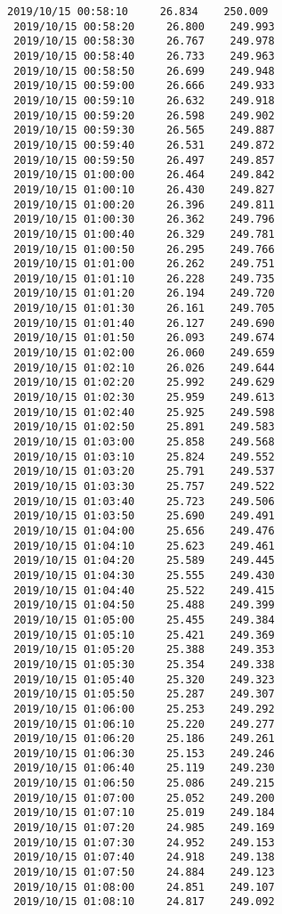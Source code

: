 \documentclass[11pt]{article}
\begin{document}
\begin{Verbatim}[commandchars=\\\{\}]
 2019/10/15 00:58:10     26.834    250.009
 2019/10/15 00:58:20     26.800    249.993
 2019/10/15 00:58:30     26.767    249.978
 2019/10/15 00:58:40     26.733    249.963
 2019/10/15 00:58:50     26.699    249.948
 2019/10/15 00:59:00     26.666    249.933
 2019/10/15 00:59:10     26.632    249.918
 2019/10/15 00:59:20     26.598    249.902
 2019/10/15 00:59:30     26.565    249.887
 2019/10/15 00:59:40     26.531    249.872
 2019/10/15 00:59:50     26.497    249.857
 2019/10/15 01:00:00     26.464    249.842
 2019/10/15 01:00:10     26.430    249.827
 2019/10/15 01:00:20     26.396    249.811
 2019/10/15 01:00:30     26.362    249.796
 2019/10/15 01:00:40     26.329    249.781
 2019/10/15 01:00:50     26.295    249.766
 2019/10/15 01:01:00     26.262    249.751
 2019/10/15 01:01:10     26.228    249.735
 2019/10/15 01:01:20     26.194    249.720
 2019/10/15 01:01:30     26.161    249.705
 2019/10/15 01:01:40     26.127    249.690
 2019/10/15 01:01:50     26.093    249.674
 2019/10/15 01:02:00     26.060    249.659
 2019/10/15 01:02:10     26.026    249.644
 2019/10/15 01:02:20     25.992    249.629
 2019/10/15 01:02:30     25.959    249.613
 2019/10/15 01:02:40     25.925    249.598
 2019/10/15 01:02:50     25.891    249.583
 2019/10/15 01:03:00     25.858    249.568
 2019/10/15 01:03:10     25.824    249.552
 2019/10/15 01:03:20     25.791    249.537
 2019/10/15 01:03:30     25.757    249.522
 2019/10/15 01:03:40     25.723    249.506
 2019/10/15 01:03:50     25.690    249.491
 2019/10/15 01:04:00     25.656    249.476
 2019/10/15 01:04:10     25.623    249.461
 2019/10/15 01:04:20     25.589    249.445
 2019/10/15 01:04:30     25.555    249.430
 2019/10/15 01:04:40     25.522    249.415
 2019/10/15 01:04:50     25.488    249.399
 2019/10/15 01:05:00     25.455    249.384
 2019/10/15 01:05:10     25.421    249.369
 2019/10/15 01:05:20     25.388    249.353
 2019/10/15 01:05:30     25.354    249.338
 2019/10/15 01:05:40     25.320    249.323
 2019/10/15 01:05:50     25.287    249.307
 2019/10/15 01:06:00     25.253    249.292
 2019/10/15 01:06:10     25.220    249.277
 2019/10/15 01:06:20     25.186    249.261
 2019/10/15 01:06:30     25.153    249.246
 2019/10/15 01:06:40     25.119    249.230
 2019/10/15 01:06:50     25.086    249.215
 2019/10/15 01:07:00     25.052    249.200
 2019/10/15 01:07:10     25.019    249.184
 2019/10/15 01:07:20     24.985    249.169
 2019/10/15 01:07:30     24.952    249.153
 2019/10/15 01:07:40     24.918    249.138
 2019/10/15 01:07:50     24.884    249.123
 2019/10/15 01:08:00     24.851    249.107
 2019/10/15 01:08:10     24.817    249.092

\end{Verbatim}
\end{document}
